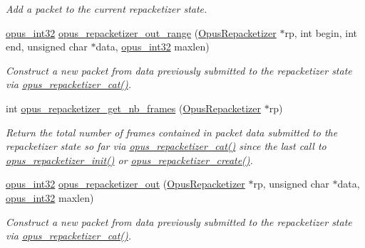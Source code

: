 \begin{DoxyCompactItemize}
\begin{DoxyCompactList}\small\item\em Add a packet to the current repacketizer state. \end{DoxyCompactList}\item 
\hyperlink{opus__types_8h_aa4d309d6f80b99dbabebc8f98879ab9a}{opus\+\_\+int32} \hyperlink{group__opus__repacketizer_gac591b550d92125b4abfa11a4b609f51f}{opus\+\_\+repacketizer\+\_\+out\+\_\+range} (\hyperlink{group__opus__repacketizer_ga1f85070a64bcbf5bf24f5ccb80323e7b}{Opus\+Repacketizer} $\ast$rp, int begin, int end, unsigned char $\ast$data, \hyperlink{opus__types_8h_aa4d309d6f80b99dbabebc8f98879ab9a}{opus\+\_\+int32} maxlen)
\begin{DoxyCompactList}\small\item\em Construct a new packet from data previously submitted to the repacketizer state via \hyperlink{group__opus__repacketizer_ga2840dd56bfa37f8c6874355b9ce8fb46}{opus\+\_\+repacketizer\+\_\+cat()}. \end{DoxyCompactList}\item 
int \hyperlink{group__opus__repacketizer_ga2cad98d04458aafdf6bb9f22f34ea7c0}{opus\+\_\+repacketizer\+\_\+get\+\_\+nb\+\_\+frames} (\hyperlink{group__opus__repacketizer_ga1f85070a64bcbf5bf24f5ccb80323e7b}{Opus\+Repacketizer} $\ast$rp)
\begin{DoxyCompactList}\small\item\em Return the total number of frames contained in packet data submitted to the repacketizer state so far via \hyperlink{group__opus__repacketizer_ga2840dd56bfa37f8c6874355b9ce8fb46}{opus\+\_\+repacketizer\+\_\+cat()} since the last call to \hyperlink{group__opus__repacketizer_gab42ff7c3f8a49ff5029fcf60f3b853f0}{opus\+\_\+repacketizer\+\_\+init()} or \hyperlink{group__opus__repacketizer_ga6f8813666ef851550ecf8658a731ff7d}{opus\+\_\+repacketizer\+\_\+create()}. \end{DoxyCompactList}\item 
\hyperlink{opus__types_8h_aa4d309d6f80b99dbabebc8f98879ab9a}{opus\+\_\+int32} \hyperlink{group__opus__repacketizer_ga19ff1e91a8fa652380f972a224a26481}{opus\+\_\+repacketizer\+\_\+out} (\hyperlink{group__opus__repacketizer_ga1f85070a64bcbf5bf24f5ccb80323e7b}{Opus\+Repacketizer} $\ast$rp, unsigned char $\ast$data, \hyperlink{opus__types_8h_aa4d309d6f80b99dbabebc8f98879ab9a}{opus\+\_\+int32} maxlen)
\begin{DoxyCompactList}\small\item\em Construct a new packet from data previously submitted to the repacketizer state via \hyperlink{group__opus__repacketizer_ga2840dd56bfa37f8c6874355b9ce8fb46}{opus\+\_\+repacketizer\+\_\+cat()}. \end{DoxyCompactList}\item 

\end{DoxyCompactItemize}
